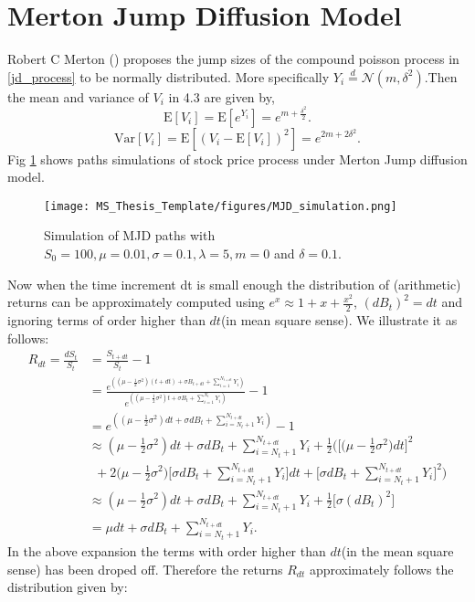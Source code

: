 \documentclass[12pt]{report}
\newcommand{\E}{\mathrm{E}}
\newcommand{\Var}{\mathrm{Var}}
\begin{document}
\section{Merton Jump Diffusion Model}
Robert C Merton (\cite{merton_1976}) proposes the jump sizes of the compound poisson process in \ref{jd_process} to be normally distributed. More specifically $Y_i \stackrel{d}{=} \mathcal{N}(m,\delta^{2})$.Then the mean and variance of $V_i$ in 4.3 are given by,
$$\E[V_i] = \E[e^{Y_i}] = e^{m + \frac{\delta^{2}}{2}}.$$
$$\Var[V_i] = \E[(V_i - \E[V_i])^{2}] = e^{2 m + 2 \delta^{2}}.$$
Fig \ref{mjd_paths} shows paths simulations of stock price process under Merton Jump diffusion model.
\begin{figure}[H]
    \centering
    \texttt{[image: MS\_Thesis\_Template/figures/MJD\_simulation.png]}
    \caption{Simulation of MJD paths with $S_0=100, \mu=0.01,\sigma=0.1,\lambda=5,m=0$ and $\delta=0.1$.}
\label{mjd_paths}    
\end{figure}
Now when the time increment dt is small enough the distribution of (arithmetic) returns can be approximately computed using $e^x \approx 1 + x + \frac{x^{2}}{2}$, $(dB_t)^{2} = dt$ and ignoring terms of order higher than $dt$(in mean square sense). We illustrate it as follows:
\begin{align*}
R_{dt} = \frac{dS_t}{S_t} & = \frac{S_{t+dt}}{S_t} - 1 \\
& = \frac{e^{\left((\mu - \frac{1}{2} \sigma^{2})(t + dt) + \sigma B_{t+dt} +\sum_{i=1}^{N_{t+dt}} Y_i\right)}}{e^{\left((\mu - \frac{1}{2} \sigma^{2})t + \sigma B_{t} + \sum_{i= 1}^{N_{t}} Y_i\right)}} - 1 \\
& = e^{\left((\mu - \frac{1}{2} \sigma^{2}) dt + \sigma dB_t + \sum_{i=N_t + 1}^{N_{t+dt}} Y_i\right)} - 1\\
& \approx(\mu - \frac{1}{2} \sigma^{2}) dt + \sigma dB_t + \sum_{i=N_t + 1}^{N_{t+dt}} Y_i + \frac{1}{2} \Bigg(\Big[\Big(\mu - \frac{1}{2} \sigma^{2}\Big) dt\Big]^{2}\\
&~~ + 2 \Big(\mu - \frac{1}{2} \sigma^{2}\Big)\Big[\sigma dB_t + \sum_{i=N_t + 1}^{N_{t+dt}} Y_i\Big] dt  + \Big[\sigma dB_t + \sum_{i=N_t + 1}^{N_{t+dt}} Y_i\Big]^{2}\Bigg)\\
& \approx(\mu - \frac{1}{2} \sigma^{2}) dt + \sigma dB_t + \sum_{i=N_t + 1}^{N_{t+dt}} Y_i + \frac{1}{2}\Big[\sigma (dB_{t})^{2}\Big]\\
& =  \mu dt + \sigma dB_{t} + \sum_{i=N_t + 1}^{N_{t+dt}} Y_i.
\end{align*}
In the above expansion the terms with order higher than $dt$(in the mean square sense) has been droped off. Therefore the returns $R_{dt}$ approximately follows the distribution given by:  
\end{document}
